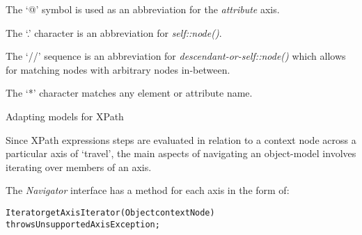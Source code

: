 \documentclass[20pt,landscape,headrule,footrule]{foils}
\begin{document}
The `@' symbol is used as an abbreviation for the \emph{attribute}
axis.




The `.' character is an abbreviation for \emph{self::node()}.


The `//' sequence is an abbreviation for
\emph{descendant-or-self::node()}
which allows for matching nodes with arbitrary nodes in-between.


The `*' character matches any element or attribute name.





\begin{center}
Adapting models for XPath
\end{center}



Since XPath expressions steps are evaluated in relation to a context
node across a particular axis of `travel', the main aspects of
navigating an object-model involves iterating over members of an axis.

The \emph{Navigator} interface has a method for each axis in
the form of:

\begin{center}
\begin{minipage}{0.8\textwidth}
\small
\begin{alltt}
Iterator getAxisIterator(Object contextNode)
    throws UnsupportedAxisException;     
\end{alltt}
\end{minipage}
\end{center}
\end{document}
